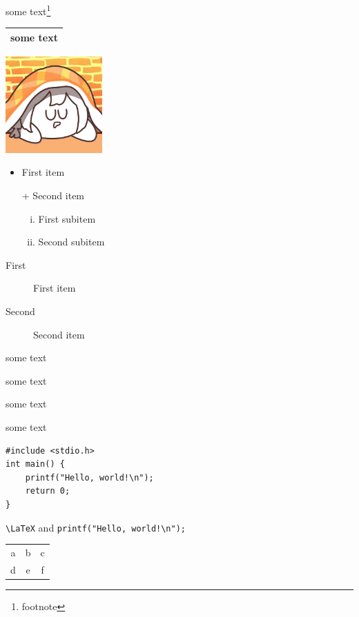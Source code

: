 \documentclass{article}
\begin{document}
some text\footnote{footnote}

\begin{tabular}{l}
\hline some text\footnotemark \\\hline
\end{tabular}

\includegraphics[width=10em,angle=30]{avatar}

\begin{itemize}
    \item First item
    \item[+] Second item
    \begin{enumerate}[i.]
        \item First subitem\label{item:subitem}
        \item Second subitem
    \end{enumerate}
\end{itemize}

\begin{description}
    \item[First] First item
    \item[Second] Second item
\end{description}

\begin{center}
some text
\end{center}
\begin{flushright}some text\end{flushright}

\centering some text

\raggedleft some text
\raggedright

\begin{verbatim}
#include <stdio.h>
int main() {
    printf("Hello, world!\n");
    return 0;
}
\end{verbatim}

\verb|\LaTeX| and \verb*|printf("Hello, world!\n");|

\begin{tabular}{@{}c@{:}c|c}
a & b & c \\
\cline{2-3}
d & e & f \\
\end{tabular}
\end{document}
